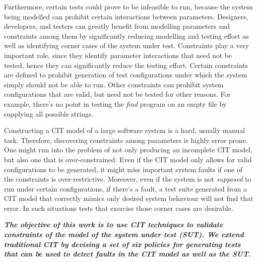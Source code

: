 	Furthermore, certain tests could prove to be infeasible to run, because the system being modelled can prohibit certain interactions between parameters. 
	Designers, developers, and testers can greatly benefit from modelling parameters and constraints among them by significantly reducing modelling and testing effort \cite{Petke15:practical} as well as identifying corner cases of the system under test. 
	Constraints play a very important role, since they identify parameter interactions that need not be tested, hence they can significantly reduce the testing effort.
	Certain constraints are defined to prohibit generation of test configurations under which the system simply should not be able to run.  
	Other constraints can prohibit system configurations that are valid, but need not be tested for other reasons. For example, there's no point in testing the \emph{find} program on an empty file by supplying all possible strings. %
	
	Constructing a CIT model of a large software system is a hard, usually manual task.  Therefore, discovering constraints among parameters is highly error prone. One might run into the problem of not only producing an incomplete CIT model, but also one that is over-constrained. Even if the CIT model only allows for valid configurations to be generated, it might miss important system faults if one of the constraints is over-restrictive. Moreover, even if the system is not \emph{supposed} to run under certain configurations, if there's a fault, a test suite generated from a CIT model that correctly mimics only desired system behaviour will not find that error. In such situations tests that exercise those corner cases are desirable. 
	
	\textbf{\emph{The objective of this work is to use CIT techniques to validate constraints of the model of the system under test (SUT). We extend traditional CIT by devising a set of six policies for generating tests that can be used to detect faults in the CIT model as well as the SUT.}}
	
